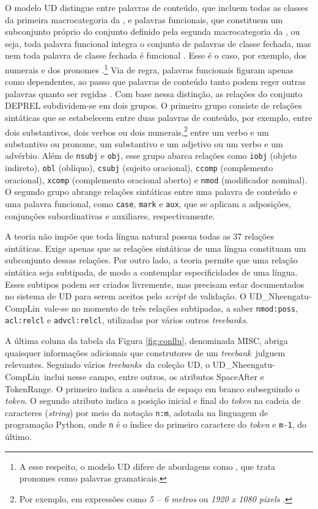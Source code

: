 \documentclass[portuguese]{textolivre}
\newcommand{\tbc}{UD\_Nheengatu-CompLin}
\newcommand{\cdc}{a coleção UD}
\newcommand{\tbs}{\textit{treebanks}}
\newcommand{\tb}{\textit{treebank}}
\begin{document}
O modelo UD distingue entre palavras de conteúdo, que incluem todas as classes da primeira macrocategoria da , e palavras funcionais, que constituem um subconjunto próprio do conjunto definido pela segunda macrocategoria da , ou seja, toda palavra funcional integra o conjunto de palavras de classe fechada, mas nem toda palavra de classe fechada é funcional \parencite{Lehmann2023-word-classes}. Esse é o caso, por exemplo, dos numerais e dos pronomes \parencite{lopes2022corpora}.\footnote{A esse respeito, o modelo UD difere de abordagens como \textcite{Lehmann2013-nature}, que trata pronomes como palavras gramaticais.} Via de regra, palavras funcionais figuram apenas como dependentes, ao passo que palavras de conteúdo tanto podem reger outras palavras quanto ser regidas \parencite{UD2024-Syntax}. Com base nessa distinção, as relações do conjunto DEPREL subdividem-se em dois grupos. O primeiro grupo consiste de relações sintáticas que se estabelecem entre duas palavras de conteúdo, por exemplo, entre dois substantivos, dois verbos ou dois numerais,\footnote{Por exemplo, em expressões como \textit{5 -- 6 metros} ou \textit{1920 x 1080 pixels} \parencite[p. 285]{de-marneffe-etal-2021-universal-k}.} entre um verbo e um substantivo ou pronome, um substantivo e um adjetivo ou um verbo e um advérbio. Além de \texttt{nsubj} e \texttt{obj}, esse grupo abarca relações como \texttt{iobj} (objeto indireto), \texttt{obl} (oblíquo), \texttt{csubj} (sujeito oracional), \texttt{ccomp} (complemento oracional), \texttt{xcomp} (complemento oracional aberto) e \texttt{nmod} (modificador nominal). O segundo grupo abrange relações sintáticas entre uma palavra de conteúdo e uma palavra funcional, como \texttt{case}, \texttt{mark} e \texttt{aux}, que se aplicam a adposições, conjunções subordinativas e auxiliares, respectivamente.

A teoria não impõe que toda língua natural possua todas as 37 relações sintáticas. Exige apenas que as relações sintáticas de uma língua constituam um subconjunto dessas relações. Por outro lado, a teoria permite que uma relação sintática seja subtipada, de modo a contemplar especificidades de uma língua. Esses subtipos podem ser criados livremente, mas precisam estar documentados no sistema de UD para serem aceitos pelo \textit{script} de validação. O \tbc~vale-se no momento de três relações subtipadas, a saber \texttt{nmod:poss}, \texttt{acl:relcl} e \texttt{advcl:relcl}, utilizadas por vários outros \textit{treebanks}. 

A última coluna da tabela da Figura \ref{fig:conllu}, denominada MISC, abriga quaisquer informações adicionais que construtores de um \tb~julguem relevantes. Seguindo vários \tbs~d\cdc, o \tbc~inclui nesse campo, entre outros, os atributos Space\-After e Token\-Range. O primeiro indica a ausência de espaço em branco subseguindo o \textit{token}. O segundo atributo indica a posição inicial e final do \textit{token} na cadeia de caracteres (\textit{string}) por meio da notação \texttt{n:m}, adotada na linguagem de programação Python, onde \texttt{n} é o índice do primeiro caractere do \textit{token} e \texttt{m-1}, do último. 
\end{document}
